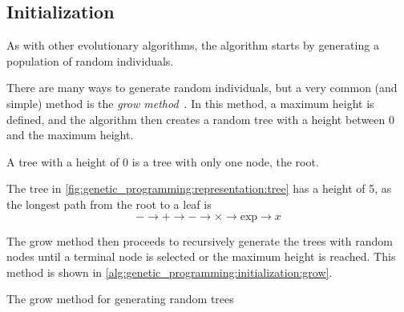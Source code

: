 \subsection{Initialization}
\label{sec:genetic_programming:initialization}
  As with other evolutionary algorithms, the algorithm starts by generating a
  population of random individuals.
  
  There are many ways to generate random individuals, but a very common (and
  simple) method is the \emph{grow 
  method}~\autocite{kozaGeneticProgrammingProgramming1992a}.
  In this method, a maximum height is defined, and the algorithm then creates a
  random tree with a height between 0 and the maximum height.

  \begin{remark}
    A tree with a height of 0 is a tree with only one node, the root.
  \end{remark}

  \begin{remark}
    The tree in \vref{fig:genetic_programming:representation:tree} has a height
    of 5, as the longest path from the root to a leaf is 
    \[
      - \to + \to - \to \times \to \mathrm{exp} \to x
    \]
  \end{remark}

  The grow method then proceeds to recursively generate the trees with random
  nodes until a terminal node is selected or the maximum height is reached.
  This method is shown in \vref{alg:genetic_programming:initialization:grow}.

  \begin{algorithm}[ht!]
    \caption{The grow method for generating random trees}
    \label{alg:genetic_programming:initialization:grow}
  \end{algorithm}

